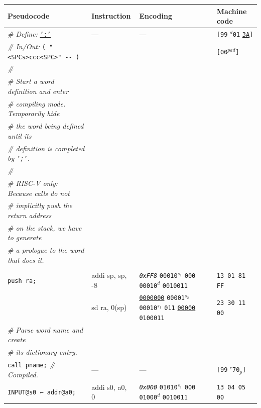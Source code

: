 \documentclass[a4paper,12pt,final]{article}
\begin{document}
\begin{table}[!htbp] \begin{adjustwidth}{-1cm}{-1cm} \fontsize{8}{9.600000}\selectfont
\begin{center}
\begin{tabular}{l|ll|l}
\textbf{Pseudocode} & \textbf{Instruction} & \textbf{Encoding} & \textbf{Machine code}\\[0pt]
\hline
\emph{\# Define:} \uline{\texttt{':'}} & --- & --- & \texttt{[99} \(^{d}\)​\texttt{01} \uline{\texttt{3A}}​\texttt{]}\\[0pt]
\emph{\# In/Out:} \texttt{( "<SPCs>ccc<SPC>" -​- )} &  &  & \texttt{[00}​\(^{pad}\)​\texttt{]}\\[0pt]
\emph{\#} &  &  & \\[0pt]
\emph{\# Start a word definition and enter} &  &  & \\[0pt]
\emph{\# compiling mode. Temporarily hide} &  &  & \\[0pt]
\emph{\# the word being defined until its} &  &  & \\[0pt]
\emph{\# definition is completed by \texttt{';'}.} &  &  & \\[0pt]
\emph{\#} &  &  & \\[0pt]
\emph{\# RISC-V only: Because calls do not} &  &  & \\[0pt]
\emph{\# implicitly push the return address} &  &  & \\[0pt]
\emph{\# on the stack, we have to generate} &  &  & \\[0pt]
\emph{\# a prologue to the word that does it.} &  &  & \\[0pt]
 &  &  & \\[0pt]
\texttt{push ra;} & addi sp, sp, -8 & \emph{\texttt{0xFF8}}                    \texttt{00010}​\(^{s_{1}}\) \texttt{000} \texttt{00010}​\(^{d}\)  \texttt{0010011} & \texttt{13 01 81 FF}\\[0pt]
 & sd ra, 0(sp) & \uline{\texttt{0000000}} \texttt{00001}​\(^{s_{2}}\) \texttt{00010}​\(^{s_{1}}\) \texttt{011} \uline{\texttt{00000}} \texttt{0100011} & \texttt{23 30 11 00}\\[0pt]
\emph{\# Parse word name and create} &  &  & \\[0pt]
\emph{\# its dictionary entry.} &  &  & \\[0pt]
\texttt{call pname;}  \emph{\# Compiled.} & --- & --- & \texttt{[99} \(^{c}\)​\texttt{70}​\(_{p}\)​\texttt{]}\\[0pt]
\texttt{INPUT@s0 ← addr@a0;} & addi s0, a0, 0 & \emph{\texttt{0x000}}                    \texttt{01010}​\(^{s_{1}}\) \texttt{000} \texttt{01000}​\(^{d}\)  \texttt{0010011} & \texttt{13 04 05 00}\\[0pt]

\end{tabular}
\end{center}
\end{adjustwidth}
\end{table}
\end{document}
